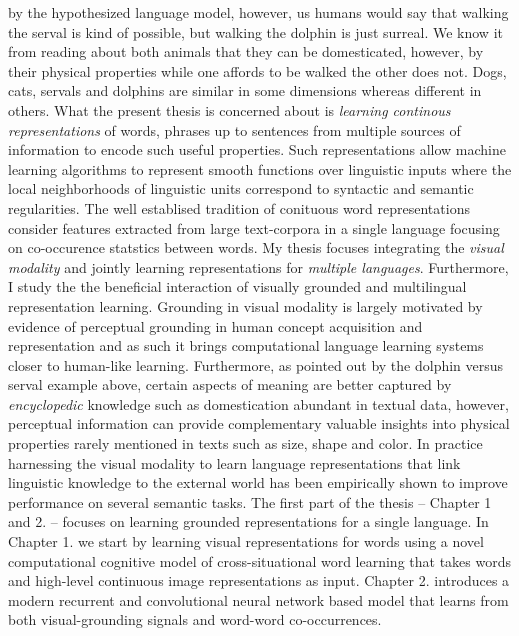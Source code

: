 by the hypothesized language model, however, us humans would say that walking the serval is
kind of possible, but walking the dolphin is just surreal. We know it from reading about both animals
that they can be domesticated, however, by their physical properties while one affords to be walked
the other does not. Dogs, cats, servals and dolphins are similar in some dimensions whereas
different in others.
What the present thesis is concerned about is \emph{learning continous representations}
of words, phrases up to sentences from multiple sources of information to encode such useful properties.
Such representations allow machine learning algorithms to represent smooth functions over linguistic
inputs where the local neighborhoods of linguistic units correspond to syntactic and semantic regularities.
The well establised tradition of conituous word representations consider features extracted
from large text-corpora in a single language focusing on co-occurence statstics between words.
My thesis focuses integrating the \emph{visual modality} and jointly learning representations for
\emph{multiple languages}. Furthermore, I study the the beneficial interaction of
visually grounded and multilingual representation learning.
Grounding in visual modality is largely motivated by evidence of
perceptual grounding in human concept acquisition and representation \cite{barsalou2003grounding} and as such
it brings computational language learning systems closer to human-like learning.
Furthermore, as pointed out by the dolphin versus serval example above,
certain aspects of meaning are better captured by \emph{encyclopedic}
knowledge such as domestication abundant in textual data, however, perceptual information
can provide complementary valuable insights into physical properties rarely mentioned in texts such as size,
shape and color. In practice harnessing the visual modality to learn language
representations that link linguistic knowledge
to the external world \cite{kiela2014improving,baroni2016grounding,elliott2017imagination,kiela2017learning,yoo2017improving}
has been empirically shown to improve performance on several semantic tasks.
The first part of the thesis -- Chapter 1 and 2. -- focuses on learning grounded representations for a single language.
In Chapter 1. we start by learning visual representations for words using a novel computational
cognitive model of cross-situational word learning that takes words and high-level continuous image
representations as input. Chapter 2. introduces a modern recurrent and convolutional neural network based
model that learns from both visual-grounding signals and word-word co-occurrences.
